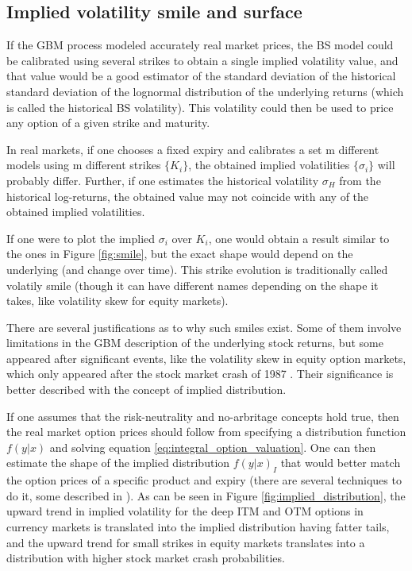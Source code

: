 \documentclass[12,twoside]{mammeTFM}
\theoremstyle{definition}
\theoremstyle{remark}
\begin{document}
\subsection{Implied volatility smile and surface} \label{subsec:smile_and_surf}
If the GBM process modeled accurately real market prices, the BS model could be calibrated using several strikes to obtain a single implied volatility value, and that value would be a good estimator of the standard deviation of the historical standard deviation of the lognormal distribution of the underlying returns (which is called the historical BS volatility). This volatility could then be used to price any option of a given strike and maturity. 

In real markets, if one chooses a fixed expiry and calibrates a set  m different models using m different strikes $\{K_i\}$, the obtained implied volatilities $\{\sigma_i\}$ will probably differ. Further, if one estimates the historical volatility $\sigma_H$ from the historical log-returns, the obtained value may not coincide with any of the obtained implied volatilities.

If one were to plot the implied $\sigma_i$ over $K_i$, one would obtain a result similar to the ones in Figure \ref{fig:smile}, but the exact shape would depend on the underlying (and change over time). This strike evolution is traditionally called volatily smile (though it can have different names depending on the shape it takes, like volatility skew for equity markets).

There are several justifications as to why such smiles exist. Some of them involve limitations in the GBM description of the underlying stock returns, but some appeared after significant events, like the volatility skew in equity option markets, which only appeared after the stock market crash of 1987 \cite{hul09}. Their significance is better described with the concept of implied distribution.

If one assumes that the risk-neutrality and no-arbritage concepts hold true, then the real market option prices should follow from specifying a distribution function $f(y|x)$ and solving equation \ref{eq:integral_option_valuation}. One can then estimate the shape of the implied distribution $f(y|x)_I$ that would better match the option prices of a specific product and expiry (there are several techniques to do it, some described in \cite{jac96, pea00}). As can be seen in Figure \ref{fig:implied_distribution}, the upward trend in implied volatility for the deep ITM and OTM options in currency markets is translated into the implied distribution having fatter tails, and the upward trend for small strikes in equity markets translates into a distribution with higher stock market crash probabilities.
\end{document}
